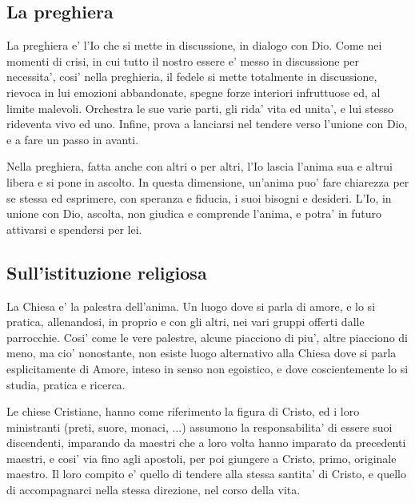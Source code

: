 \subsection{La preghiera}

La preghiera e' l'Io che si mette in discussione, in dialogo con Dio. Come nei momenti di crisi, in cui tutto il nostro essere e' messo in discussione per necessita', cosi' nella preghieria, il fedele si mette totalmente in discussione, rievoca in lui emozioni abbandonate, spegne forze interiori infruttuose ed, al limite malevoli. Orchestra le sue varie parti, gli rida' vita ed unita', e lui stesso rideventa vivo ed uno. Infine, prova a lanciarsi nel tendere verso l'unione con Dio, e a fare un passo in avanti.

Nella preghiera, fatta anche con altri o per altri, l'Io lascia l'anima sua e altrui libera e si pone in ascolto. In questa dimensione, un'anima puo' fare chiarezza per se stessa ed esprimere, con speranza e fiducia, i suoi bisogni e desideri. 
L'Io, in unione con Dio, ascolta, non giudica e comprende l'anima, e potra' in futuro attivarsi e spendersi per lei.


\subsection{Sull'istituzione religiosa}
La Chiesa e' la palestra dell'anima. Un luogo dove si parla di amore, e lo si pratica, allenandosi, in proprio e con gli altri, nei vari gruppi offerti dalle parrocchie. Cosi' come le vere palestre, alcune piacciono di piu', altre piacciono di meno, ma cio' nonostante, non esiste luogo alternativo alla Chiesa dove si parla esplicitamente di Amore, inteso in senso non egoistico, e dove coscientemente lo si studia, pratica e ricerca. 

Le chiese Cristiane, hanno come riferimento la figura di Cristo, ed i loro ministranti (preti, suore, monaci, ...) assumono la responsabilita' di essere suoi discendenti, imparando da maestri che a loro volta hanno imparato da precedenti maestri, e cosi' via fino agli apostoli, per poi giungere a Cristo, primo, originale maestro. Il loro compito e' quello di tendere alla stessa santita' di Cristo, e quello di accompagnarci nella stessa direzione, nel corso della vita.

